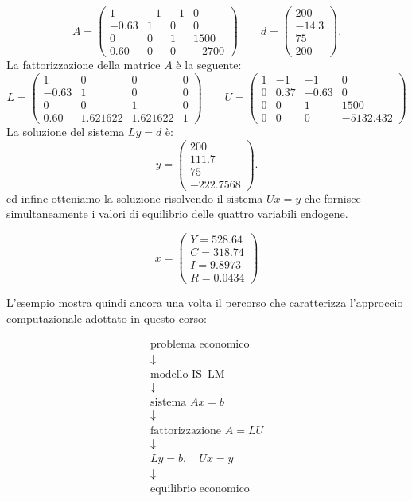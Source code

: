 \[
A=
\begin{pmatrix}
1 & -1 & -1 & 0 \\
-0.63 & 1 & 0 & 0 \\
0 & 0 & 1 & 1500 \\
0.60 & 0 & 0 & -2700
\end{pmatrix}\qquad
d=
\begin{pmatrix}
200 \\
-14.3 \\
75 \\
200
\end{pmatrix}.
\]
La fattorizzazione della matrice $A$ è la seguente:
\[
L=
\begin{pmatrix}
1 & 0 & 0 & 0 \\
-0.63 & 1 & 0 & 0 \\
0 & 0 & 1 & 0 \\
0.60 & 1.621622 & 1.621622 & 1
\end{pmatrix}
\qquad
U=
\begin{pmatrix}
1 & -1 & -1 & 0 \\
0 & 0.37 & -0.63 & 0 \\
0 & 0 & 1 & 1500 \\
0 & 0 & 0 & -5132.432
\end{pmatrix}
\]
La soluzione del sistema $Ly=d$ è:
\[
y=
\begin{pmatrix}
200 \\
111.7 \\
75 \\
-222.7568
\end{pmatrix}.
\]
ed infine otteniamo la soluzione risolvendo il sistema $Ux=y$
che fornisce simultaneamente i valori di equilibrio delle quattro variabili endogene.

\begin{equation*}
x=
\begin{pmatrix}
	Y=528.64\\
	C=318.74\\
	I=9.8973\\
	R=0.0434
\end{pmatrix}
\end{equation*}


L'esempio mostra quindi ancora una volta il percorso che
caratterizza l'approccio computazionale adottato in questo corso:

\begin{equation*}
\boxed{
\begin{array}{c}
\text{problema economico}\\
\downarrow\\
\text{modello IS--LM}\\
\downarrow\\
\text{sistema }Ax=b\\
\downarrow\\
\text{fattorizzazione }A=LU\\
\downarrow\\
Ly=b,\quad Ux=y\\
\downarrow\\
\text{equilibrio economico}
\end{array}}
\end{equation*}


